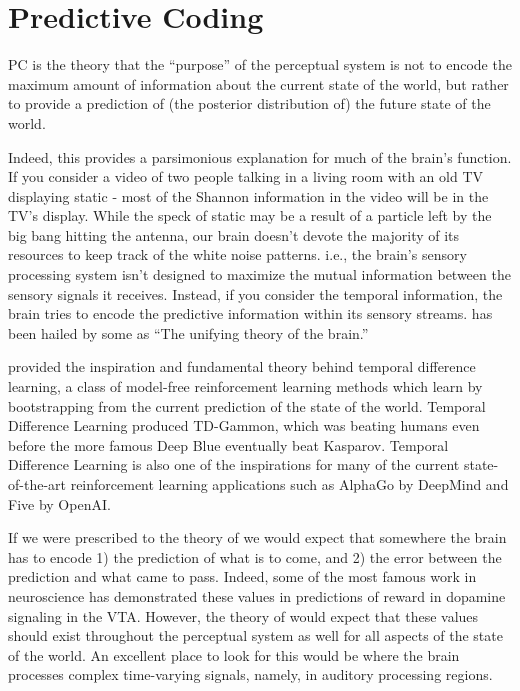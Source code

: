 \chapter{Predictive Coding}

\acf{PC} is the theory that the ``purpose'' of the perceptual system is not to encode the maximum amount of information about the current state of the world, but rather to provide a prediction of (the posterior distribution of) the future state of the world. 

Indeed, this provides a parsimonious explanation for much of the brain's function. If you consider a video of two people talking in a living room with an old TV displaying static - most of the Shannon information in the video will be in the TV's display. While the speck of static may be a result of a particle left by the big bang hitting the antenna, our brain doesn't devote the majority of its resources to keep track of the white noise patterns. i.e., the brain's sensory processing system isn't designed to maximize the mutual information between the sensory signals it receives. Instead, if you consider the temporal information, the brain tries to encode the predictive information within its sensory streams. \PC has been hailed by some as ``The unifying theory of the brain.''

\PC provided the inspiration and fundamental theory behind temporal difference learning, a class of model-free reinforcement learning methods which learn by bootstrapping from the current prediction of the state of the world. Temporal Difference Learning produced TD-Gammon, which was beating humans even before the more famous Deep Blue eventually beat Kasparov. Temporal Difference Learning is also one of the inspirations for many of the current state-of-the-art reinforcement learning applications such as AlphaGo by DeepMind and Five by OpenAI.

If we were prescribed to the theory of \PC we would expect that somewhere the brain has to encode 1) the prediction of what is to come, and 2) the error between the prediction and what came to pass. Indeed, some of the most famous work in neuroscience has demonstrated these values in predictions of reward in dopamine signaling in the VTA. However, the theory of \PC would expect that these values should exist throughout the perceptual system as well for all aspects of the state of the world. An excellent place to look for this would be where the brain processes complex time-varying signals, namely, in auditory processing regions.


